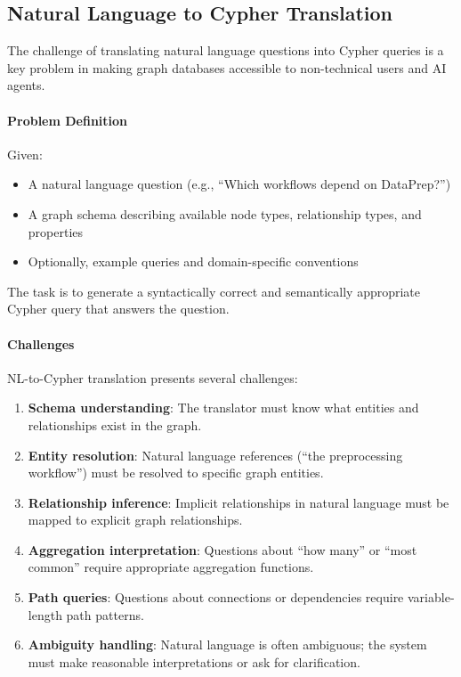 \documentclass[a4paper,twoside]{sapthesis}
\begin{document}
\subsection{Natural Language to Cypher Translation}

The challenge of translating natural language questions into Cypher queries is a key problem in making graph databases accessible to non-technical users and AI agents.

\paragraph{Problem Definition}

Given:
\begin{itemize}
    \item A natural language question (e.g., ``Which workflows depend on DataPrep?'')
    \item A graph schema describing available node types, relationship types, and properties
    \item Optionally, example queries and domain-specific conventions
\end{itemize}

The task is to generate a syntactically correct and semantically appropriate Cypher query that answers the question.

\paragraph{Challenges}

NL-to-Cypher translation presents several challenges:

\begin{enumerate}
    \item \textbf{Schema understanding}: The translator must know what entities and relationships exist in the graph.
    
    \item \textbf{Entity resolution}: Natural language references (``the preprocessing workflow'') must be resolved to specific graph entities.
    
    \item \textbf{Relationship inference}: Implicit relationships in natural language must be mapped to explicit graph relationships.
    
    \item \textbf{Aggregation interpretation}: Questions about ``how many'' or ``most common'' require appropriate aggregation functions.
    
    \item \textbf{Path queries}: Questions about connections or dependencies require variable-length path patterns.
    
    \item \textbf{Ambiguity handling}: Natural language is often ambiguous; the system must make reasonable interpretations or ask for clarification.
\end{enumerate}
\end{document}
